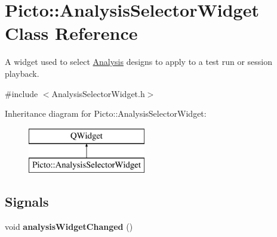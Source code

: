 \hypertarget{class_picto_1_1_analysis_selector_widget}{\section{Picto\-:\-:Analysis\-Selector\-Widget Class Reference}
\label{class_picto_1_1_analysis_selector_widget}
}


A widget used to select \hyperlink{class_picto_1_1_analysis}{Analysis} designs to apply to a test run or session playback.  




{\ttfamily \#include $<$Analysis\-Selector\-Widget.\-h$>$}

Inheritance diagram for Picto\-:\-:Analysis\-Selector\-Widget\-:\begin{figure}[H]
\begin{center}
\leavevmode
\includegraphics[height=2.000000cm]{class_picto_1_1_analysis_selector_widget}
\end{center}
\end{figure}
\subsection*{Signals}
\begin{DoxyCompactItemize}
\item 
\hypertarget{class_picto_1_1_analysis_selector_widget_a7df7ae71a49a04bcfeea9592bbad578a}{void {\bfseries analysis\-Widget\-Changed} ()}\label{class_picto_1_1_analysis_selector_widget_a7df7ae71a49a04bcfeea9592bbad578a}

\end{DoxyCompactItemize}
